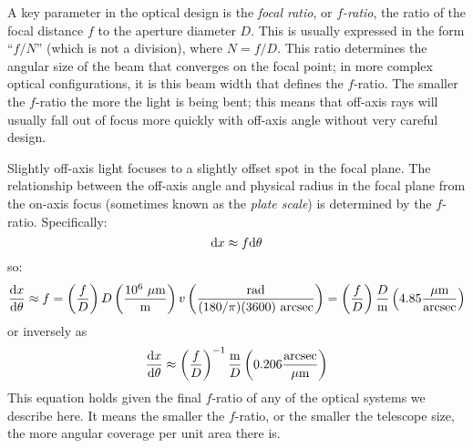 A key parameter in the optical design is the {\it focal ratio}, or
{\it $f$-ratio}, the ratio of the focal distance $f$ to the aperture
diameter $D$. This is usually expressed in the form ``$f/N$'' (which
is not a division), where $N = f/D$. This ratio determines the angular
size of the beam that converges on the focal point; in more complex
optical configurations, it is this beam width that defines the
$f$-ratio. The smaller the $f$-ratio the more the light is being bent;
this means that off-axis rays will usually fall out of focus more
quickly with off-axis angle without very careful design.

Slightly off-axis light focuses to a slightly offset spot in the focal
plane. The relationship between the off-axis angle and physical radius
in the focal plane from the on-axis focus (sometimes known as the {\it
plate scale}) is determined by the $f$-ratio. Specifically:
\begin{equation}
{\rm d}x \approx f {\rm d}\theta
\end{equation}
so:
\begin{equation}
\frac{{\rm d}x}{{\rm d}\theta} \approx f
= \left(\frac{f}{D}\right) D
\left(\frac{10^6~\mu{\rm m}}{{\rm m}}\right)v
\left(\frac{\rm rad}{(180/\pi)(3600)~{\rm arcsec}}\right)
= \left(\frac{f}{D}\right) \frac{D}{{\rm m}}
\left(4.85 \frac{\mu{\rm m}}{\rm arcsec}\right)
\end{equation}
or inversely as 
\begin{equation}
\frac{{\rm d}x}{{\rm d}\theta} \approx 
\left(\frac{f}{D}\right)^{-1} \frac{{\rm m}}{D}
\left(0.206\frac{\rm arcsec}{\mu{\rm m}}\right)
\end{equation}
This equation holds given the final $f$-ratio of any of the optical
systems we describe here. It means the smaller the $f$-ratio, or the
smaller the telescope size, the more angular coverage per unit area
there is.


